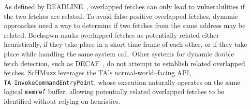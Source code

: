 \documentclass[conference]{IEEEtran} %
\newcommand{\sysname}{ScHMuzz\xspace}
\providecommand{\DIFaddbegin}{} %
\begin{document}
As defined by DEADLINE~\cite{deadline}, overlapped fetches can only lead to vulnerabilities if 
the two fetches are related. To avoid false positive overlapped fetches, dynamic approaches need 
a way to determine if two fetches from the same address may be related.
Bochspwn marks overlapped fetches as potentially related either heuristically, if they take place in a short 
time frame of each other, or if they take place while handling the same system call. 
Other systems for dynamic double fetch detection, such as DECAF~\cite{decaf}, do not attempt to establish related overlapped fetches.
\sysname leverages the TA’s normal-world–facing API, \texttt{TA\_InvokeCommandEntryPoint}, 
whose execution naturally operates on the same logical \texttt{memref} buffer, allowing potentially 
related overlapped fetches to be identified without relying on heuristics.

\DIFaddbegin 

\end{document}
